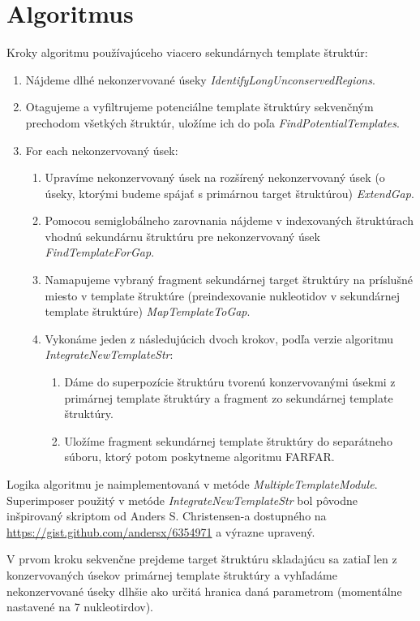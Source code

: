 \section{Algoritmus}
\indent Kroky algoritmu používajúceho viacero sekundárnych template štruktúr:
\begin{enumerate}
\item Nájdeme dlhé nekonzervované úseky \textit{IdentifyLongUnconservedRegions}.
\item Otagujeme a vyfiltrujeme potenciálne template štruktúry sekvenčným prechodom všetkých štruktúr, uložíme  ich do poľa \textit{FindPotentialTemplates}.
\item For each nekonzervovaný úsek:
\begin{enumerate}
\item Upravíme nekonzervovaný úsek na rozšírený nekonzervovaný úsek (o úseky, ktorými budeme spájať s primárnou target štruktúrou) \textit{ExtendGap}.
\item Pomocou semiglobálneho zarovnania nájdeme v indexovaných štruktúrach vhodnú sekundárnu štruktúru pre nekonzervovaný úsek \textit{FindTemplateForGap}.
\item Namapujeme vybraný fragment sekundárnej target štruktúry na príslušné miesto v template štruktúre (preindexovanie nukleotidov v sekundárnej template štruktúre) \textit{MapTemplateToGap}.
\item Vykonáme jeden z následujúcich dvoch krokov, podľa verzie algoritmu \textit{IntegrateNewTemplateStr}:
\begin{enumerate}
\item Dáme do superpozície štruktúru tvorenú konzervovanými úsekmi z primárnej template štruktúry a fragment zo sekundárnej template štruktúry.
\item Uložíme fragment sekundárnej template štruktúry do separátneho súboru, ktorý potom poskytneme algoritmu FARFAR.
\end{enumerate}
\end{enumerate}
\end{enumerate}


\indent Logika algoritmu je naimplementovaná v metóde \textit{MultipleTemplateModule}. Superimposer použitý v metóde \textit{IntegrateNewTemplateStr} bol pôvodne inšpirovaný skriptom od Anders S. Christensen-a dostupného na \url{https://gist.github.com/andersx/6354971} a výrazne upravený.  


\indent V prvom kroku sekvenčne prejdeme target štruktúru skladajúcu sa zatiaľ len z konzervovaných úsekov primárnej template štruktúry a vyhľadáme nekonzervované úseky dlhšie ako určitá hranica daná parametrom (momentálne nastavené na 7 nukleotirdov).


